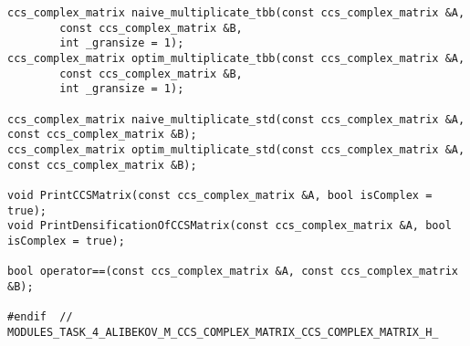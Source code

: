 \documentclass{report}
\begin{document}
\begin{lstlisting}
ccs_complex_matrix naive_multiplicate_tbb(const ccs_complex_matrix &A,
        const ccs_complex_matrix &B,
        int _gransize = 1);
ccs_complex_matrix optim_multiplicate_tbb(const ccs_complex_matrix &A,
        const ccs_complex_matrix &B,
        int _gransize = 1);

ccs_complex_matrix naive_multiplicate_std(const ccs_complex_matrix &A, const ccs_complex_matrix &B);
ccs_complex_matrix optim_multiplicate_std(const ccs_complex_matrix &A, const ccs_complex_matrix &B);

void PrintCCSMatrix(const ccs_complex_matrix &A, bool isComplex = true);
void PrintDensificationOfCCSMatrix(const ccs_complex_matrix &A, bool isComplex = true);

bool operator==(const ccs_complex_matrix &A, const ccs_complex_matrix &B);

#endif  // MODULES_TASK_4_ALIBEKOV_M_CCS_COMPLEX_MATRIX_CCS_COMPLEX_MATRIX_H_
	\end{lstlisting}
\end{document}
